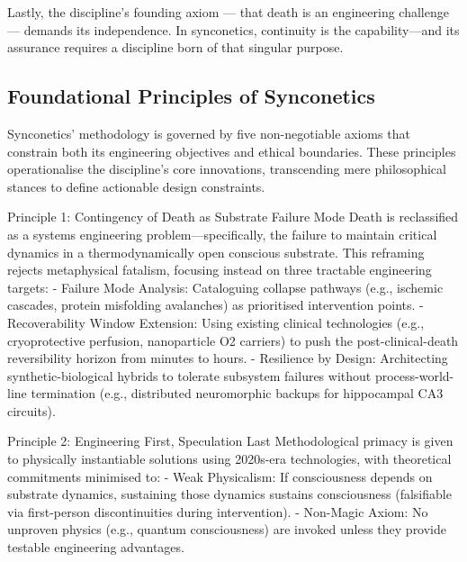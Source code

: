 \documentclass[10pt]{article}
\begin{document}
\begin{sloppypar}
  Lastly, the discipline’s founding axiom — that death is an engineering challenge — demands its independence. In synconetics, continuity is the capability—and its assurance requires a discipline born of that singular purpose.

  \subsection{Foundational Principles of Synconetics}
  \label{sec:foundational-principles}


  Synconetics’ methodology is governed by five non-negotiable axioms that constrain both its engineering objectives and ethical boundaries. These principles operationalise the discipline’s core innovations, transcending mere philosophical stances to define actionable design constraints.


  Principle 1: Contingency of Death as Substrate Failure Mode
  Death is reclassified as a systems engineering problem—specifically, the failure to maintain critical dynamics in a thermodynamically open conscious substrate. This reframing rejects metaphysical fatalism, focusing instead on three tractable engineering targets:
  - Failure Mode Analysis: Cataloguing collapse pathways (e.g., ischemic cascades, protein misfolding avalanches) as prioritised intervention points.
  - Recoverability Window Extension: Using existing clinical technologies (e.g., cryoprotective perfusion, nanoparticle O2 carriers) to push the post-clinical-death reversibility horizon from minutes to hours.
  - Resilience by Design: Architecting synthetic-biological hybrids to tolerate subsystem failures without process-world-line termination (e.g., distributed neuromorphic backups for hippocampal CA3 circuits).

  Principle 2: Engineering First, Speculation Last
  Methodological primacy is given to physically instantiable solutions using 2020s-era technologies, with theoretical commitments minimised to:
  - Weak Physicalism: If consciousness depends on substrate dynamics, sustaining those dynamics sustains consciousness (falsifiable via first-person discontinuities during intervention).
  - Non-Magic Axiom: No unproven physics (e.g., quantum consciousness) are invoked unless they provide testable engineering advantages.


\end{sloppypar}
\end{document}
